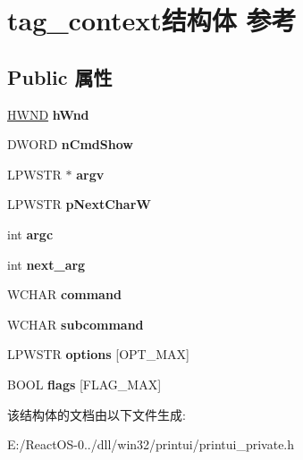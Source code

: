 \hypertarget{structtag__context}{}\section{tag\+\_\+context结构体 参考}
\label{structtag__context}
\subsection*{Public 属性}
\begin{DoxyCompactItemize}
\item 
\mbox{\label{structtag__context_a5046d6889407333f3cd60832eadee7f1}} 
\hyperlink{interfacevoid}{H\+W\+ND} {\bfseries h\+Wnd}
\item 
\mbox{\label{structtag__context_ad3e4a753c78afed5d792cea441dd2e3e}} 
D\+W\+O\+RD {\bfseries n\+Cmd\+Show}
\item 
\mbox{\label{structtag__context_ac678cbedcd6e2bf5d1d44f2f8632c91e}} 
L\+P\+W\+S\+TR $\ast$ {\bfseries argv}
\item 
\mbox{\label{structtag__context_a9e0ddc98eabe381d6f1d11b807a7ac12}} 
L\+P\+W\+S\+TR {\bfseries p\+Next\+CharW}
\item 
\mbox{\label{structtag__context_aa3af996b0a19b6140626305003df94a0}} 
int {\bfseries argc}
\item 
\mbox{\label{structtag__context_aa9434c7ab0a0a8b730aa3e2e912d529b}} 
int {\bfseries next\+\_\+arg}
\item 
\mbox{\label{structtag__context_a6f8337f1b6974a0c828e37389e12a5f6}} 
W\+C\+H\+AR {\bfseries command}
\item 
\mbox{\label{structtag__context_a3fafdeb0b57a1189cb1bc8cd695b8b2d}} 
W\+C\+H\+AR {\bfseries subcommand}
\item 
\mbox{\label{structtag__context_a69fd3acf48431e7a28f3cb0b522ee369}} 
L\+P\+W\+S\+TR {\bfseries options} \mbox{[}O\+P\+T\+\_\+\+M\+AX\mbox{]}
\item 
\mbox{\label{structtag__context_aab529f0772e7ed4ea3b80f90e9f2090d}} 
B\+O\+OL {\bfseries flags} \mbox{[}F\+L\+A\+G\+\_\+\+M\+AX\mbox{]}
\end{DoxyCompactItemize}


该结构体的文档由以下文件生成\+:\begin{DoxyCompactItemize}
\item 
E\+:/\+React\+O\+S-\/0../dll/win32/printui/printui\+\_\+private.\+h\end{DoxyCompactItemize}
